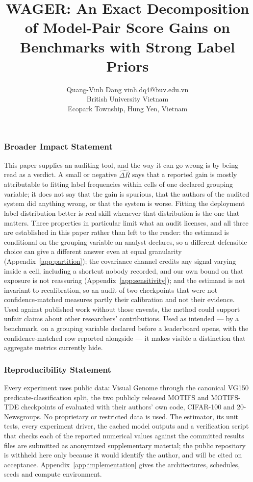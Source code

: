 \documentclass[10pt]{article}
\title{WAGER: An Exact Decomposition of Model-Pair Score Gains
on Benchmarks with Strong Label Priors}
\author{\name Quang-Vinh Dang \email vinh.dq4@buv.edu.vn \\
      \addr British University Vietnam \\
      Ecopark Township, Hung Yen, Vietnam}
\theoremstyle{plain}
\theoremstyle{definition}
\begin{document}
\maketitle

\begin{abstract}

\end{abstract}








\subsubsection*{Broader Impact Statement}
This paper supplies an auditing tool, and the way it can go wrong is by being read as a
verdict. A small or negative $\widehat{\Delta R}$ says that a reported gain is mostly
attributable to fitting label frequencies within cells of one declared grouping variable;
it does not say that the gain is spurious, that the authors of the audited system did
anything wrong, or that the system is worse. Fitting the deployment label distribution
better is real skill whenever that distribution is the one that matters. Three properties
in particular limit what an audit licenses, and all three are established in this paper
rather than left to the reader: the estimand is conditional on the grouping variable an
analyst declares, so a different defensible choice can give a different answer even at
equal granularity (Appendix~\ref{app:partition}); the covariance channel credits any
signal varying inside a cell, including a shortcut nobody recorded, and our own bound on
that exposure is not reassuring (Appendix~\ref{app:sensitivity}); and the estimand is not
invariant to recalibration, so an audit of two checkpoints that were not
confidence-matched measures partly their calibration and not their evidence. Used against
published work without those caveats, the method could support unfair claims about other
researchers' contributions. Used as intended --- by a benchmark, on a grouping variable
declared before a leaderboard opens, with the confidence-matched row reported alongside
--- it makes visible a distinction that aggregate metrics currently hide.

\subsubsection*{Reproducibility Statement}
Every experiment uses public data: Visual Genome through the canonical VG150
predicate-classification split, the two publicly released MOTIFS and MOTIFS-TDE
checkpoints of \citet{tang2020unbiased} evaluated with their authors' own code,
CIFAR-100 and 20-Newsgroups. No proprietary or restricted data is used. The estimator,
its unit tests, every experiment driver, the cached model outputs and a verification
script that checks each of the reported numerical values against the committed results
files are submitted as anonymized supplementary material; the public repository is
withheld here only because it would identify the author, and will be cited on
acceptance. Appendix~\ref{app:implementation} gives the architectures, schedules, seeds
and compute environment.
\end{document}

